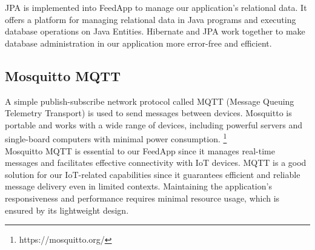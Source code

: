 \noindent JPA is implemented into FeedApp to manage our application's relational data. It offers a platform for managing relational data in Java programs and executing database operations on Java Entities. Hibernate and JPA work together to make database administration in our application more error-free and efficient. \\


\subsection{Mosquitto MQTT}

\noindent A simple publish-subscribe network protocol called MQTT (Message Queuing Telemetry Transport) is used to send messages between devices. Mosquitto is portable and works with a wide range of devices, including powerful servers and single-board computers with minimal power consumption. \footnote{https://mosquitto.org/} \\

\noindent Mosquitto MQTT is essential to our FeedApp since it manages real-time messages and facilitates effective connectivity with IoT devices. MQTT is a good solution for our IoT-related capabilities since it guarantees efficient and reliable message delivery even in limited contexts. Maintaining the application's responsiveness and performance requires minimal resource usage, which is ensured by its lightweight design.



